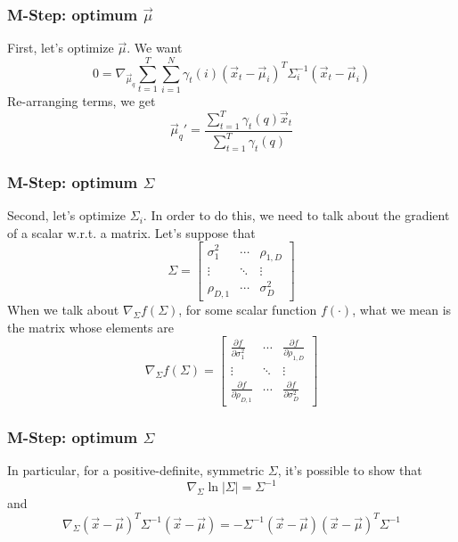 \documentclass{beamer}
\begin{document}
\begin{frame}
  \frametitle{M-Step: optimum $\vec\mu$}

  First, let's optimize $\vec\mu$.  We want
  \begin{displaymath}
    0 = \nabla_{\vec\mu_q}\sum_{t=1}^T\sum_{i=1}^N\gamma_t(i)(\vec{x}_t-\vec\mu_i)^T\Sigma_i^{-1}(\vec{x}_t-\vec\mu_i)
  \end{displaymath}
  Re-arranging terms, we get
  \begin{displaymath}
    \vec\mu_q' = \frac{\sum_{t=1}^T\gamma_t(q)\vec{x}_{t}}{\sum_{t=1}^T\gamma_t(q)}
  \end{displaymath}
\end{frame}

\begin{frame}
  \frametitle{M-Step: optimum $\Sigma$}

  Second, let's optimize $\Sigma_{i}$.  In order to do this, we need
  to talk about the gradient of a scalar w.r.t. a matrix.  Let's
  suppose that
  \begin{displaymath}
    \Sigma = \left[\begin{array}{ccc}
        \sigma_1^2 & \cdots & \rho_{1,D}\\
        \vdots & \ddots & \vdots\\
        \rho_{D,1} & \cdots & \sigma_D^2
      \end{array}
      \right]
  \end{displaymath}
  When we talk about $\nabla_\Sigma f(\Sigma)$, for some scalar
  function $f(\cdot)$, what we mean is the matrix whose elements are 
  \begin{displaymath}
    \nabla_\Sigma f(\Sigma) = \left[\begin{array}{ccc}
        \frac{\partial f}{\partial\sigma_1^2} & \cdots & \frac{\partial f}{\partial\rho_{1,D}}\\
        \vdots & \ddots & \vdots\\
        \frac{\partial f}{\partial\rho_{D,1}} & \cdots & \frac{\partial f}{\partial\sigma_D^2}
      \end{array}
      \right]
  \end{displaymath}
\end{frame}

\begin{frame}
  \frametitle{M-Step: optimum $\Sigma$}

  In particular, for a positive-definite, symmetric $\Sigma$, it's possible to show that
  \begin{displaymath}
    \nabla_\Sigma \ln|\Sigma| = \Sigma^{-1}
  \end{displaymath}
  and
  \begin{displaymath}
    \nabla_\Sigma (\vec{x}-\vec\mu)^T\Sigma^{-1}(\vec{x}-\vec\mu) = -\Sigma^{-1}(\vec{x}-\vec\mu)(\vec{x}-\vec\mu)^T\Sigma^{-1}
  \end{displaymath}
\end{frame}
  
\end{document}
